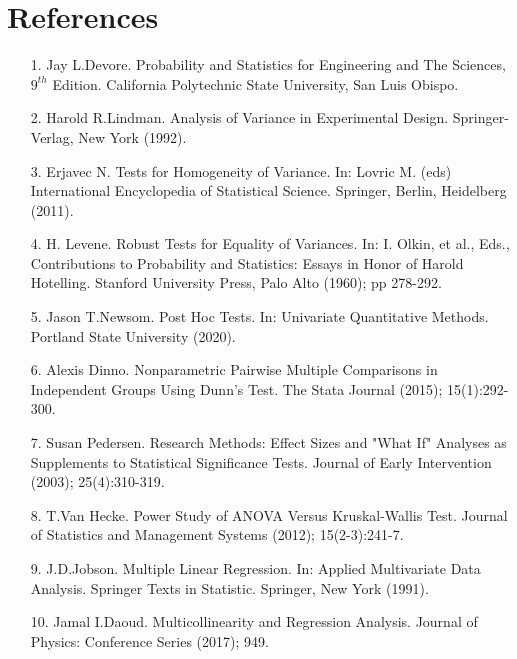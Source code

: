\documentclass[a4paper]{article}
\begin{document}
\section{References}
\begin{itemize}
    \item[1.] Jay L.Devore. Probability and Statistics for Engineering and The Sciences, $9^{th}$ Edition. California Polytechnic State University, San Luis Obispo.
    
    \item[2.] Harold R.Lindman. Analysis of Variance in Experimental Design. Springer-Verlag, New York (1992).
    
    \item[3.] Erjavec N. Tests for Homogeneity of Variance. In: Lovric M. (eds) International Encyclopedia of Statistical Science. Springer, Berlin, Heidelberg (2011).
    
    \item[4.] H. Levene. Robust Tests for Equality of Variances. In: I. Olkin, et al., Eds., Contributions to Probability and Statistics: Essays in Honor of Harold Hotelling. Stanford University Press, Palo Alto (1960); pp 278-292. 
    
    \item[5.] Jason T.Newsom. Post Hoc Tests. In: Univariate Quantitative Methods. Portland State University (2020).
    
    \item[6.] Alexis Dinno. Nonparametric Pairwise Multiple Comparisons in Independent Groups Using Dunn's Test. The Stata Journal (2015); 15(1):292-300.
    
    \item[7.] Susan Pedersen. Research Methods: Effect Sizes and "What If" Analyses as Supplements to Statistical Significance Tests. Journal of Early Intervention (2003); 25(4):310-319.

    \item[8.]  T.Van Hecke. Power Study of ANOVA Versus Kruskal-Wallis Test. Journal of Statistics and Management Systems (2012); 15(2-3):241-7.
    
    \item[9.] J.D.Jobson. Multiple Linear Regression. In: Applied Multivariate Data Analysis. Springer Texts in Statistic. Springer, New York (1991).
    
    \item[10.] Jamal I.Daoud. Multicollinearity and Regression Analysis. Journal of Physics: Conference Series (2017); 949.
    

\end{itemize}
\end{document}
